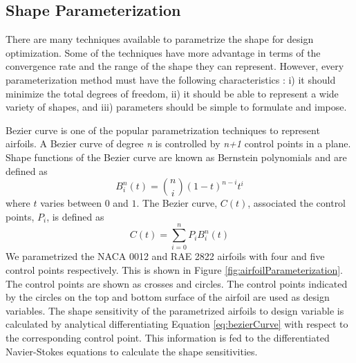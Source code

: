 \documentclass[12pt]{aiaa-pretty}
\begin{document}
\subsection{Shape Parameterization}\label{sec:shapeParameterization}
There are many techniques available to parametrize the shape for design optimization. Some of the techniques have more advantage in terms of the convergence rate and the range of the shape they can represent. However, every parameterization method must have the following characteristics \cite{salunke2014airfoil}: i) it should minimize the total degrees of freedom, ii) it should be able to represent a wide variety of shapes, and iii) parameters should be simple to formulate and impose.

Bezier curve is one of the popular parametrization techniques to represent airfoils. A Bezier curve of degree \emph{n} is controlled by \emph{n+1} control points in a plane. Shape functions of the Bezier curve are known as Bernstein polynomials and are defined as
%
\begin{equation}\label{eq:bernsteinPolynomials}
	B_i^n(t) = {n \choose i} (1 - t)^{n - i} t^i
\end{equation}
%
where $t$ varies between $0$ and $1$. The Bezier curve, $C(t)$, associated the control points, $P_i$, is defined as
%
\begin{equation}\label{eq:bezierCurve}
	C(t) = \sum_{i=0}^n P_i B_i^n(t)
\end{equation}
%
We parametrized the NACA 0012 and RAE 2822 airfoils with four and five control points respectively. This is shown in Figure \ref{fig:airfoilParameterization}. The control points are shown as crosses and circles. The control points indicated by the circles on the top and bottom surface of the airfoil are used as design variables. The shape sensitivity of the parametrized airfoils to design variable is calculated by analytical differentiating Equation \eqref{eq:bezierCurve} with respect to the corresponding control point. This information is fed to the differentiated Navier-Stokes equations to calculate the shape sensitivities.
%
\end{document}
